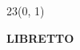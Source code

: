 \documentclass[11pt]{article}
\begin{document}
\begin{textblock}{23}(0, 1)
\begin{center}
\color{white}
\huge \textbf{LIBRETTO}
\end{center}
\end{textblock}
\end{document}
